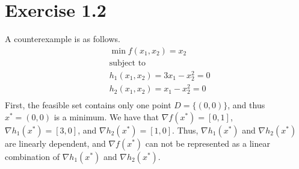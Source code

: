 \documentclass[11pt]{report}
\begin{document}
\section*{Exercise 1.2}
A counterexample is as follows.
\begin{align*}
& \min f(x_1, x_2) = x_2\\
& \text{subject to}\\
& h_1(x_1, x_2) = 3x_1 - x_2^2 = 0\\
& h_2(x_1, x_2) = x_1 - x_2^2 = 0\\
\end{align*}
First, the feasible set contains only one point $D = \{(0,0)\}$, and thus $x^* = (0,0)$ is a minimum. We have that $\nabla f(x^*) = [0,1]$, $\nabla h_1(x^*) = [3, 0]$, and $\nabla h_2(x^*) = [1, 0]$. Thus, $\nabla h_1(x^*)$ and $\nabla h_2(x^*)$ are linearly dependent, and $\nabla f(x^*)$ can not be represented as a linear combination of $\nabla h_1(x^*)$ and $\nabla h_2(x^*)$.
\end{document}
